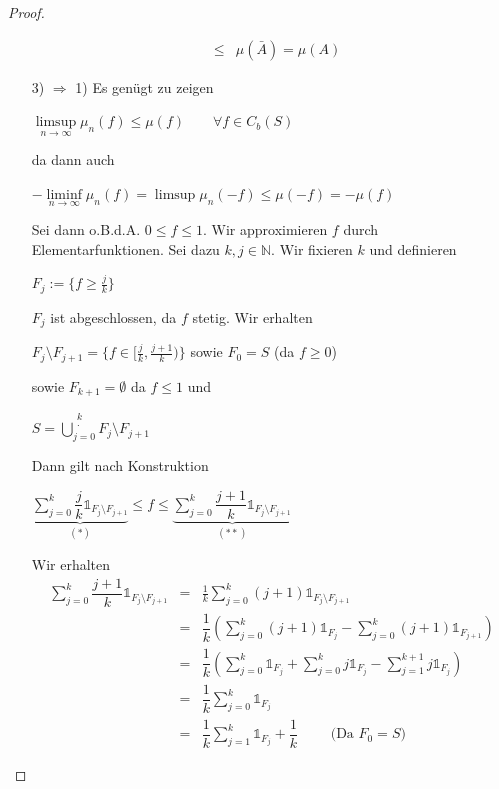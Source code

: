 \documentclass[10pt,a4paper]{report}
\newcommand{\N}{\mathbb{N}}
\numberwithin{equation}{section}
\numberwithin{figure}{section}
\theoremstyle{plain}
\theoremstyle{definition}
\theoremstyle{remark}
\theoremstyle{plain}
\newcommand{\1}{ \mathbb{1} } %
\begin{document}
\begin{proof}
\begin{itemize}
\begin{eqnarray*}
      & \leq & \mu(\bar{A})=\mu(A)
    \end{eqnarray*} 
  \item[3) $\Rightarrow$ 1)] Es genügt zu zeigen
    \begin{center}
      $\limsup\limits_{n \to \infty} \mu_n(f)\leq \mu(f) \qquad
      \forall f \in C_b(S)$
    \end{center}
    da dann auch
    \begin{center}
      $-\liminf\limits_{n \to \infty}\mu_n(f)=\limsup\mu_n(-f)\leq
      \mu(-f)=-\mu(f)$
    \end{center}
    Sei dann o.B.d.A. $0 \leq f \leq 1$. Wir approximieren $f$ durch
    Elementarfunktionen. Sei dazu $k,j \in \N$. Wir fixieren $k$ und
    definieren
    \begin{center}
      $F_j:=\{f \geq \frac{j}{k}\}$
    \end{center}
    $F_j$ ist abgeschlossen, da $f$ stetig. Wir erhalten
    \begin{center}
      $F_j\setminus F_{j+1}=\{f \in [\frac{j}{k},\frac{j+1}{k})\}$
      sowie $F_0=S$ (da $f \geq 0$)
    \end{center}
    sowie $F_{k+1}=\emptyset$ da $f \leq 1$ und
    \begin{center}
      $S=\bigcup\limits_{j=0}^{\substack{k\\\cdot}}F_j\setminus
      F_{j+1}$
    \end{center}
    Dann gilt nach Konstruktion
    \begin{center}
      $\underbrace{\sum\limits_{j=0}^k\dfrac{j}{k}\1_{F_j\setminus
          F_{j+1}}}_{(*)} \leq f \leq
      \underbrace{\sum\limits_{j=0}^k\dfrac{j+1}{k}\1_{F_j\setminus
          F_{j+1}}}_{(**)}$
    \end{center}
    Wir erhalten
    \begin{eqnarray*}
      \sum\limits_{j=0}^k\dfrac{j+1}{k}\1_{{F_j}\setminus F_{j+1}}&=&\frac{1}{k}\sum\limits_{j=0}^k(j+1)\1_{{F_j}\setminus F_{j+1}}\\
      &=&\dfrac{1}{k}\left(\sum\limits_{j=0}^k(j+1)\1_{F_j}-\sum\limits_{j=0}^k(j+1)\1_{F_{j+1}} \right)\\
      &=& \dfrac{1}{k}\left(\sum\limits_{j=0}^k \1_{F_j}+\sum\limits_{j=0}^k j\1_{F_j}-\sum\limits_{j=1}^{k+1} j \1_{F_j}\right)\\
      &=& \dfrac{1}{k}\sum\limits_{j=0}^k \1_{F_j}\\
      &=& \dfrac{1}{k}\sum\limits_{j=1}^k \1_{F_j} + \dfrac{1}{k} \qquad\text{ (Da } F_0=S)
    \end{eqnarray*}

\end{itemize}
\end{proof}
\end{document}
